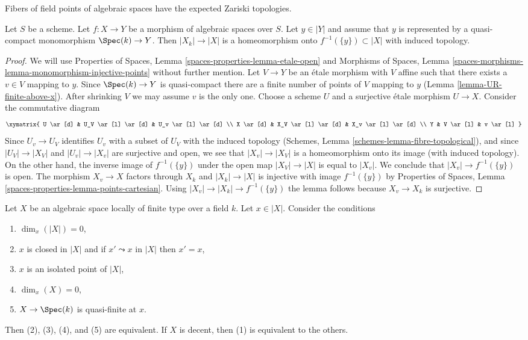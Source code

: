 \begin{lemma}
\label{lemma-topology-fibre}
\begin{slogan}
Fibers of field points of algebraic spaces have the
expected Zariski topologies.
\end{slogan}
Let $S$ be a scheme. Let $f : X \to Y$ be a morphism of algebraic spaces
over $S$.
Let $y \in |Y|$ and assume that $y$ is represented by a quasi-compact
monomorphism $\Spec(k) \to Y$. Then $|X_k| \to |X|$ is a
homeomorphism onto $f^{-1}(\{y\}) \subset |X|$ with induced topology.
\end{lemma}

\begin{proof}
We will use
Properties of Spaces, Lemma \ref{spaces-properties-lemma-etale-open}
and
Morphisms of Spaces, Lemma
\ref{spaces-morphisms-lemma-monomorphism-injective-points}
without further mention.
Let $V \to Y$ be an \'etale morphism with $V$ affine such that there
exists a $v \in V$ mapping to $y$. Since $\Spec(k) \to Y$ is quasi-compact
there are a finite number of points of $V$ mapping to $y$
(Lemma \ref{lemma-UR-finite-above-x}). After shrinking
$V$ we may assume $v$ is the only one. Choose a scheme $U$ and
a surjective \'etale morphism $U \to X$.
Consider the commutative diagram
$$
\xymatrix{
U \ar[d] & U_V \ar[l] \ar[d] & U_v \ar[l] \ar[d] \\
X \ar[d] & X_V \ar[l] \ar[d] & X_v \ar[l] \ar[d] \\
Y & V \ar[l] & v \ar[l]
}
$$
Since $U_v \to U_V$ identifies $U_v$ with a subset of $U_V$ with
the induced topology (Schemes, Lemma \ref{schemes-lemma-fibre-topological}),
and since $|U_V| \to |X_V|$ and $|U_v| \to |X_v|$ are surjective and open,
we see that $|X_v| \to |X_V|$ is a homeomorphism onto its image (with
induced topology).
On the other hand, the inverse image of $f^{-1}(\{y\})$
under the open map $|X_V| \to |X|$ is equal to $|X_v|$.
We conclude that $|X_v| \to f^{-1}(\{y\})$ is open.
The morphism $X_v \to X$ factors through $X_k$
and $|X_k| \to |X|$ is injective with image $f^{-1}(\{y\})$
by Properties of Spaces, Lemma
\ref{spaces-properties-lemma-points-cartesian}. Using
$|X_v| \to |X_k| \to f^{-1}(\{y\})$ the lemma follows because
$X_v \to X_k$ is surjective.
\end{proof}

\begin{lemma}
\label{lemma-conditions-on-point-on-space-over-field}
Let $X$ be an algebraic space locally of finite type over a field $k$.
Let $x \in |X|$. Consider the conditions
\begin{enumerate}
\item $\dim_x(|X|) = 0$,
\item $x$ is closed in $|X|$ and if $x' \leadsto x$  in $|X|$ then $x' = x$,
\item $x$ is an isolated point of $|X|$,
\item $\dim_x(X) = 0$,
\item $X \to \Spec(k)$ is quasi-finite at $x$.
\end{enumerate}
Then (2), (3), (4), and (5) are equivalent.
If $X$ is decent, then (1) is equivalent to the others.
\end{lemma}

